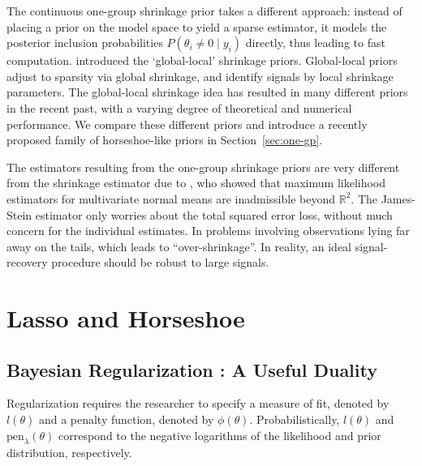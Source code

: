 \documentclass[11pt]{article}
\begin{document}
The continuous one-group shrinkage prior takes a different approach: instead of
placing a prior on the model space to yield a sparse estimator, it models the
posterior inclusion probabilities $P(\theta_i \ne 0 \mid y_i)$ directly, thus
leading to fast computation.  \citet{carvalho2009handling,
polson2010shrink, carvalho2010horseshoe, polson2012half} introduced the
`global-local' shrinkage priors. Global-local priors adjust to sparsity via
global shrinkage, and identify signals by local shrinkage parameters. The
global-local shrinkage idea has resulted in many different priors in the recent
past, with a varying degree of theoretical and numerical performance. We
compare these different priors and introduce a recently proposed family of
horseshoe-like priors in Section~\ref{sec:one-gp}.   

The estimators resulting from the one-group shrinkage priors are very different
from the shrinkage estimator due to \citet{james_estimation_1961}, who showed
that maximum
likelihood estimators for multivariate normal means are inadmissible beyond $\mathbb{R}^2$.
The James-Stein estimator only worries about the total squared error loss,
without much concern for the individual estimates. In problems involving
observations lying far away on the tails, which leads to ``over-shrinkage''.
In reality, an ideal signal-recovery procedure should be robust to large
signals.


\section{Lasso and Horseshoe}
\subsection{Bayesian Regularization : A Useful Duality}

Regularization requires the researcher to specify a measure of fit, denoted by $l(\theta)$ and a penalty function, denoted by $ \phi(\theta)$. Probabilistically,  $l(\theta)$ and $\text{pen}_{\lambda}(\theta)$ correspond to the negative logarithms of the likelihood and prior distribution, respectively.  
\end{document}
